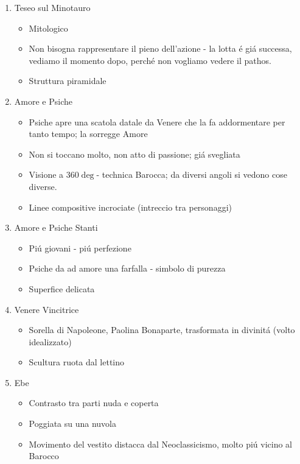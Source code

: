 \documentclass{article}
\begin{document}
\begin{enumerate}
    \item Teseo sul Minotauro
    \begin{itemize}
        \item Mitologico
        \item Non bisogna rappresentare il pieno dell'azione - la lotta é giá successa, vediamo il momento dopo, perché non vogliamo vedere il pathos.
        \item Struttura piramidale
    \end{itemize}
    \item Amore e Psiche
    \begin{itemize}
        \item Psiche apre una scatola datale da Venere che la fa addormentare per tanto tempo; la sorregge Amore
        \item Non si toccano molto, non atto di passione; giá svegliata
        \item Visione a $360\deg$- technica Barocca; da diversi angoli si vedono cose diverse.
        \item Linee compositive incrociate (intreccio tra personaggi)
    \end{itemize}
    \item Amore e Psiche Stanti
    \begin{itemize}
        \item Piú giovani - piú perfezione
        \item Psiche da ad amore una farfalla - simbolo di purezza
        \item Superfice delicata
    \end{itemize}
    \item Venere Vincitrice
    \begin{itemize}
        \item Sorella di Napoleone, Paolina Bonaparte, trasformata in divinitá (volto idealizzato)
        \item Scultura ruota dal lettino
    \end{itemize}
    \item Ebe
    \begin{itemize}
        \item Contrasto tra parti nuda e coperta
        \item Poggiata su una nuvola
        \item Movimento del vestito distacca dal Neoclassicismo, molto piú vicino al Barocco
    \end{itemize}
\end{enumerate}
\end{document}
